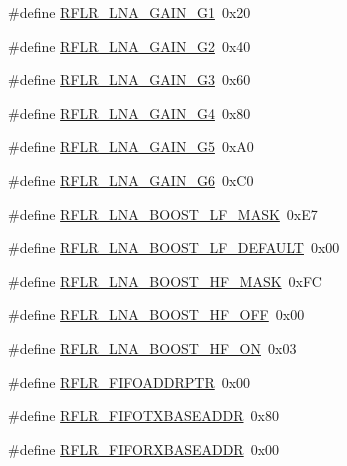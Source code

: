 \begin{DoxyCompactItemize}
\item 
\#define \hyperlink{sx1276Regs-LoRa_8h_a037aede58520e0ac15f5b63e9edef4fb}{R\+F\+L\+R\+\_\+\+L\+N\+A\+\_\+\+G\+A\+I\+N\+\_\+\+G1}~0x20
\item 
\#define \hyperlink{sx1276Regs-LoRa_8h_a20befb067e09b6a2f3768e8f0da43eec}{R\+F\+L\+R\+\_\+\+L\+N\+A\+\_\+\+G\+A\+I\+N\+\_\+\+G2}~0x40
\item 
\#define \hyperlink{sx1276Regs-LoRa_8h_accae2f3f70ca282fd61cb09a667901ba}{R\+F\+L\+R\+\_\+\+L\+N\+A\+\_\+\+G\+A\+I\+N\+\_\+\+G3}~0x60
\item 
\#define \hyperlink{sx1276Regs-LoRa_8h_a6d72851174c6d7664136736589055129}{R\+F\+L\+R\+\_\+\+L\+N\+A\+\_\+\+G\+A\+I\+N\+\_\+\+G4}~0x80
\item 
\#define \hyperlink{sx1276Regs-LoRa_8h_ae5719825fa402e40336c7acac639c5db}{R\+F\+L\+R\+\_\+\+L\+N\+A\+\_\+\+G\+A\+I\+N\+\_\+\+G5}~0x\+A0
\item 
\#define \hyperlink{sx1276Regs-LoRa_8h_aa16933aa89f284c5c3e9c3700d717902}{R\+F\+L\+R\+\_\+\+L\+N\+A\+\_\+\+G\+A\+I\+N\+\_\+\+G6}~0x\+C0
\item 
\#define \hyperlink{sx1276Regs-LoRa_8h_ace13d78a7979a589c7b3918412bb7140}{R\+F\+L\+R\+\_\+\+L\+N\+A\+\_\+\+B\+O\+O\+S\+T\+\_\+\+L\+F\+\_\+\+M\+A\+SK}~0x\+E7
\item 
\#define \hyperlink{sx1276Regs-LoRa_8h_a952b2dd390b6b2faff709e9950c7bdbf}{R\+F\+L\+R\+\_\+\+L\+N\+A\+\_\+\+B\+O\+O\+S\+T\+\_\+\+L\+F\+\_\+\+D\+E\+F\+A\+U\+LT}~0x00
\item 
\#define \hyperlink{sx1276Regs-LoRa_8h_a0276e7bb160dc7aeb54faf11570caee6}{R\+F\+L\+R\+\_\+\+L\+N\+A\+\_\+\+B\+O\+O\+S\+T\+\_\+\+H\+F\+\_\+\+M\+A\+SK}~0x\+FC
\item 
\#define \hyperlink{sx1276Regs-LoRa_8h_ab97ab7086b3dd953fa82bcf76347f433}{R\+F\+L\+R\+\_\+\+L\+N\+A\+\_\+\+B\+O\+O\+S\+T\+\_\+\+H\+F\+\_\+\+O\+FF}~0x00
\item 
\#define \hyperlink{sx1276Regs-LoRa_8h_af8786c60c42323ea89f1c133e9d82c43}{R\+F\+L\+R\+\_\+\+L\+N\+A\+\_\+\+B\+O\+O\+S\+T\+\_\+\+H\+F\+\_\+\+ON}~0x03
\item 
\#define \hyperlink{sx1276Regs-LoRa_8h_a293258103cd0271149fc3ddbc2eb37a2}{R\+F\+L\+R\+\_\+\+F\+I\+F\+O\+A\+D\+D\+R\+P\+TR}~0x00
\item 
\#define \hyperlink{sx1276Regs-LoRa_8h_ace89be0e3d72b0aa238de31aa1840fd3}{R\+F\+L\+R\+\_\+\+F\+I\+F\+O\+T\+X\+B\+A\+S\+E\+A\+D\+DR}~0x80
\item 
\#define \hyperlink{sx1276Regs-LoRa_8h_af2f960ed320739991501681945e45b7e}{R\+F\+L\+R\+\_\+\+F\+I\+F\+O\+R\+X\+B\+A\+S\+E\+A\+D\+DR}~0x00

\end{DoxyCompactItemize}
